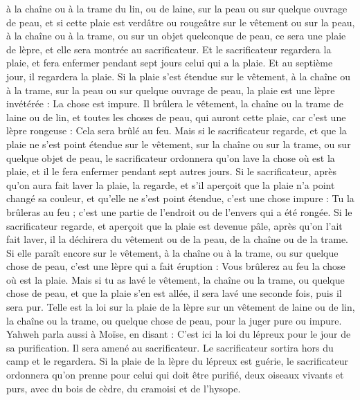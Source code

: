 \begin{multicols}{2}
à la chaîne ou à la trame du lin, ou de laine, sur la peau ou sur quelque ouvrage de peau,
et si cette plaie est verdâtre ou rougeâtre sur le vêtement ou sur la peau, à la chaîne ou à la trame, ou sur un objet quelconque de peau, ce sera une plaie de lèpre, et elle sera montrée au sacrificateur.
Et le sacrificateur regardera la plaie, et fera enfermer pendant sept jours celui qui a la plaie.
Et au septième jour, il regardera la plaie. Si la plaie s'est étendue sur le vêtement, à la chaîne ou à la trame, sur la peau ou sur quelque ouvrage de peau, la plaie est une lèpre invétérée : La chose est impure.
Il brûlera le vêtement, la chaîne ou la trame de laine ou de lin, et toutes les choses de peau, qui auront cette plaie, car c'est une lèpre rongeuse : Cela sera brûlé au feu.
Mais si le sacrificateur regarde, et que la plaie ne s'est point étendue sur le vêtement, sur la chaîne ou sur la trame, ou sur quelque objet de peau,
le sacrificateur ordonnera qu'on lave la chose où est la plaie, et il le fera enfermer pendant sept autres jours.
Si le sacrificateur, après qu'on aura fait laver la plaie, la regarde, et s'il aperçoit que la plaie n'a point changé sa couleur, et qu'elle ne s'est point étendue, c'est une chose impure : Tu la brûleras au feu ; c'est une partie de l'endroit ou de l'envers qui a été rongée.
Si le sacrificateur regarde, et aperçoit que la plaie est devenue pâle, après qu'on l'ait fait laver, il la déchirera du vêtement ou de la peau, de la chaîne ou de la trame.
Si elle paraît encore sur le vêtement, à la chaîne ou à la trame, ou sur quelque chose de peau, c'est une lèpre qui a fait éruption : Vous brûlerez au feu la chose où est la plaie.
Mais si tu as lavé le vêtement, la chaîne ou la trame, ou quelque chose de peau, et que la plaie s'en est allée, il sera lavé une seconde fois, puis il sera pur.
Telle est la loi sur la plaie de la lèpre sur un vêtement de laine ou de lin, la chaîne ou la trame, ou quelque chose de peau, pour la juger pure ou impure.
\VerseOne{}Yahweh parla aussi à Moïse, en disant :
C'est ici la loi du lépreux pour le jour de sa purification. Il sera amené au sacrificateur.
Le sacrificateur sortira hors du camp et le regardera. Si la plaie de la lèpre du lépreux est guérie,
le sacrificateur ordonnera qu'on prenne pour celui qui doit être purifié, deux oiseaux vivants et purs, avec du bois de cèdre, du cramoisi et de l'hysope.

\end{multicols}
